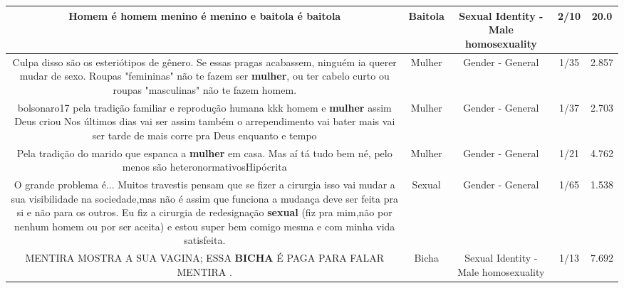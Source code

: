 \documentclass[11pt]{article}
\newlength\mylength
\begin{document}
\begin{center}
\begin{longtable}{|C{.65\mylength}|C{.30\mylength}|C{.12\mylength}|C{.12\mylength}|C{.12\mylength}|}
  \small Homem é homem menino é menino e \textbf{baitola} é baitola\normalsize   & Baitola & Sexual Identity - Male homosexuality & 2/10 & 20.0 \\  \hline
  \small Culpa disso são os esteriótipos de gênero. Se essas pragas acabassem, ninguém ia querer mudar de sexo. Roupas "femininas" não te fazem ser \textbf{mulher}, ou ter cabelo curto ou roupas "masculinas" não te fazem homem.\normalsize   & Mulher & Gender - General & 1/35 & 2.857 \\  \hline
  \small bolsonaro17  pela tradição familiar e reprodução humana kkk  homem e \textbf{mulher} assim Deus criou  Nos últimos dias vai ser assim também o arrependimento vai bater mais vai ser tarde de mais  corre pra Deus enquanto e tempo\normalsize   & Mulher & Gender - General & 1/37 & 2.703 \\  \hline
  \small Pela tradição do marido que espanca a \textbf{mulher} em casa. Mas aí tá tudo bem né, pelo menos são heteronormativosHipócrita\normalsize   & Mulher & Gender - General & 1/21 & 4.762 \\  \hline
  \small O grande problema é... Muitos travestis pensam que se fizer a cirurgia isso vai mudar a sua visibilidade na sociedade,mas não é assim que funciona a mudança deve ser feita pra si e não para os outros. Eu fiz a cirurgia de redesignação \textbf{sexual} (fiz pra mim,não por nenhum homem ou por ser aceita) e estou super bem comigo mesma e com minha vida satisfeita.\normalsize   & Sexual & Gender - General & 1/65 & 1.538 \\  \hline
  \small MENTIRA MOSTRA A SUA  VAGINA; ESSA  \textbf{BICHA} É PAGA PARA FALAR MENTIRA .\normalsize   & Bicha & Sexual Identity - Male homosexuality & 1/13 & 7.692 \\  \hline

\end{longtable}
\end{center}
\end{document}
